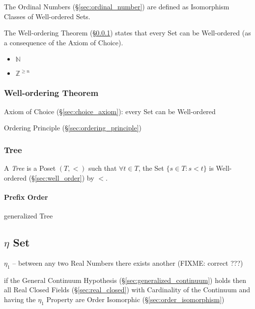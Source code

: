 The Ordinal Numbers (\S\ref{sec:ordinal_number}) are defined as
Isomorphism Classes of Well-ordered Sets.

The Well-ordering Theorem (\S\ref{sec:wellorder_theorem}) states that
every Set can be Well-ordered (as a consequence of the Axiom of
Choice).

\begin{itemize}
  \item $\mathbb{N}$
  \item $\mathbb{Z}^{\geq n}$
\end{itemize}



\subsubsection{Well-ordering Theorem}\label{sec:wellorder_theorem}

Axiom of Choice (\S\ref{sec:choice_axiom}): every Set can be
Well-ordered

Ordering Principle (\S\ref{sec:ordering_principle})



\subsubsection{Tree} \label{sec:tree}

A \emph{Tree} is a Poset $(T,<)$ such that $\forall t \in T$, the Set
$\{s \in T : s < t \}$ is Well-ordered (\S\ref{sec:well_order}) by
$<$.



\paragraph{Prefix Order}\label{sec:prefix_order}\hfill

generalized Tree



\subsection{$\eta$ Set}\label{sec:eta_set}

$\eta_1$ -- between any two Real Numbers there exists another (FIXME: correct
???)

if the General Continuum Hypothesis (\S\ref{sec:generalized_continuum}) holds
then all Real Closed Fields (\S\ref{sec:real_closed}) with Cardinality of the
Continuum and having the $\eta_1$ Property are Order Isomorphic
(\S\ref{sec:order_isomorphism})

